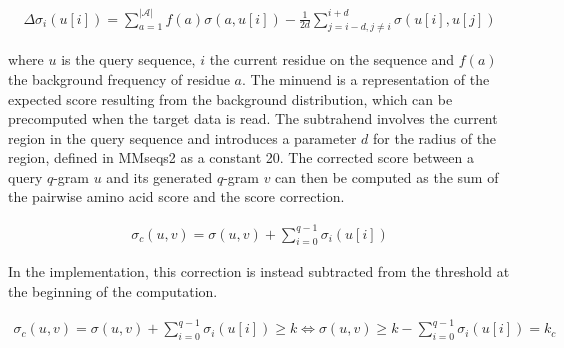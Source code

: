 \documentclass[twoside,a4paper,bsc]{master}
\newcommand{\Qgram}[1]{\(#1\)-gram}
\newcommand{\Alpha}[0]{\mathcal{A}}
\begin{document}
\begin{align}
\Delta \sigma_i(u[i]) =
\sum_{a=1}^{|\Alpha|}f(a)\sigma(a,u[i])-\frac{1}{2d}\sum_{j=i-d,j\neq
i}^{i+d}\sigma (u[i],u[j])
\end{align}

where \(u\) is the query sequence, \(i\) the current residue on the
sequence and \(f(a)\) the background frequency of residue \(a\).
The minuend is a representation of the expected score resulting from the
background distribution, which can be precomputed when the target data is
read. The subtrahend involves the current region in the query sequence and
introduces a parameter \(d\) for the radius of the region, defined in
MMseqs2 as a constant 20.
The corrected score between a query \Qgram{q} \(u\) and its generated
\Qgram{q} \(v\) can then be computed as the sum of the pairwise amino acid
score and the score correction.

\begin{align}
\sigma_c(u,v) = \sigma (u,v) + \sum_{i=0}^{q-1} \sigma_i(u[i])
\end{align}

In the implementation, this correction is instead subtracted from the
threshold at the beginning of the computation.

\begin{align}
\sigma_c(u,v) = \sigma (u,v) + \sum_{i=0}^{q-1} \sigma_i(u[i]) \geq k
\Leftrightarrow \sigma (u,v) \geq k - \sum_{i=0}^{q-1} \sigma_i(u[i]) =
k_{c}
\end{align}
\end{document}
